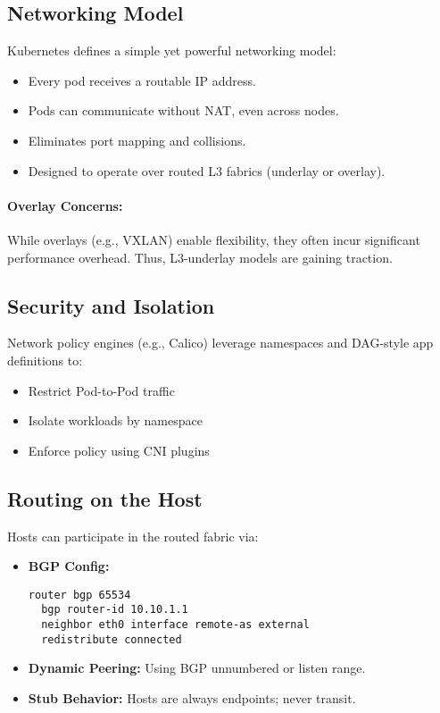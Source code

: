 \documentclass[../../../OAE-SPEC-MAIN.tex]{subfiles}
\begin{document}
\subsection*{Networking Model}

Kubernetes defines a simple yet powerful networking model:

\begin{itemize}
  \item Every pod receives a routable IP address.
  \item Pods can communicate without NAT, even across nodes.
  \item Eliminates port mapping and collisions.
  \item Designed to operate over routed L3 fabrics (underlay or overlay).
\end{itemize}

\paragraph{Overlay Concerns:} While overlays (e.g., VXLAN) enable flexibility, they often incur significant performance overhead. Thus, L3-underlay models are gaining traction.

\subsection{Security and Isolation}

Network policy engines (e.g., Calico) leverage namespaces and DAG-style app definitions to:

\begin{itemize}
  \item Restrict Pod-to-Pod traffic
  \item Isolate workloads by namespace
  \item Enforce policy using CNI plugins
\end{itemize}

\subsection{Routing on the Host}

Hosts can participate in the routed fabric via:

\begin{itemize}
  \item \textbf{BGP Config:}
\begin{verbatim}
router bgp 65534
  bgp router-id 10.10.1.1
  neighbor eth0 interface remote-as external
  redistribute connected
\end{verbatim}
  \item \textbf{Dynamic Peering:} Using BGP unnumbered or listen range.
  \item \textbf{Stub Behavior:} Hosts are always endpoints; never transit.
\end{itemize}
\end{document}
